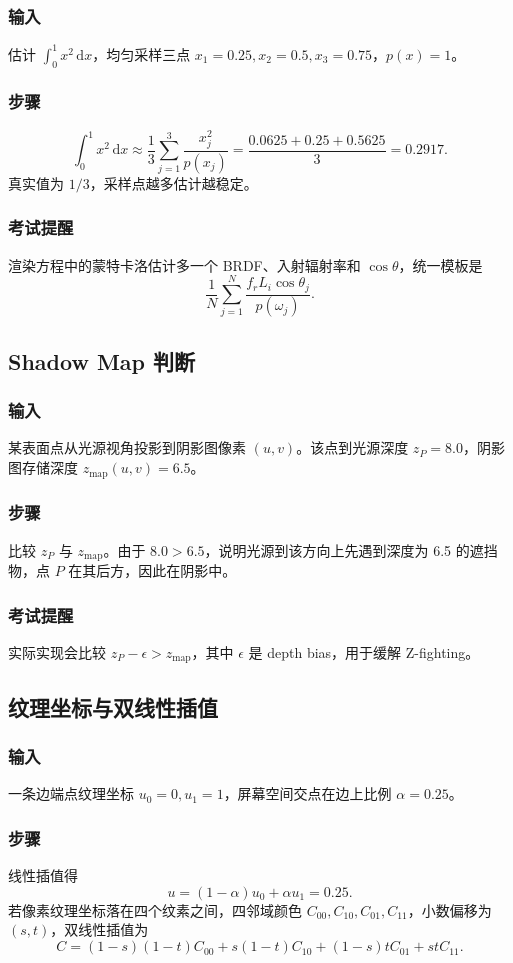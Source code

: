 \documentclass[UTF8,fontset=fandol,11pt]{ctexart}
\newcommand{\dd}{\,\mathrm{d}}
\begin{document}
\subsubsection*{输入}
估计 $\int_0^1 x^2\dd x$，均匀采样三点 $x_1=0.25,x_2=0.5,x_3=0.75$，$p(x)=1$。
\subsubsection*{步骤}
\[
\int_0^1x^2\dd x\approx\frac{1}{3}\sum_{j=1}^{3}\frac{x_j^2}{p(x_j)}
=\frac{0.0625+0.25+0.5625}{3}=0.2917.
\]
真实值为 $1/3$，采样点越多估计越稳定。
\subsubsection*{考试提醒}
渲染方程中的蒙特卡洛估计多一个 BRDF、入射辐射率和 $\cos\theta$，统一模板是
\[
\frac{1}{N}\sum_{j=1}^{N}\frac{f_r L_i\cos\theta_j}{p(\omega_j)}.
\]

\subsection{Shadow Map 判断}
\subsubsection*{输入}
某表面点从光源视角投影到阴影图像素 $(u,v)$。该点到光源深度 $z_P=8.0$，阴影图存储深度 $z_{\text{map}}(u,v)=6.5$。
\subsubsection*{步骤}
比较 $z_P$ 与 $z_{\text{map}}$。由于 $8.0>6.5$，说明光源到该方向上先遇到深度为 6.5 的遮挡物，点 $P$ 在其后方，因此在阴影中。
\subsubsection*{考试提醒}
实际实现会比较 $z_P-\epsilon>z_{\text{map}}$，其中 $\epsilon$ 是 depth bias，用于缓解 Z-fighting。

\subsection{纹理坐标与双线性插值}
\subsubsection*{输入}
一条边端点纹理坐标 $u_0=0,u_1=1$，屏幕空间交点在边上比例 $\alpha=0.25$。
\subsubsection*{步骤}
线性插值得
\[
u=(1-\alpha)u_0+\alpha u_1=0.25.
\]
若像素纹理坐标落在四个纹素之间，四邻域颜色 $C_{00},C_{10},C_{01},C_{11}$，小数偏移为 $(s,t)$，双线性插值为
\[
C=(1-s)(1-t)C_{00}+s(1-t)C_{10}+(1-s)tC_{01}+stC_{11}.
\]
\end{document}
